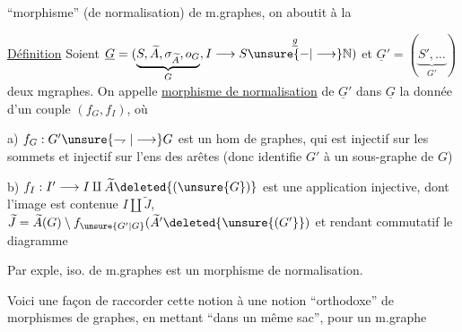 ``morphisme'' (de normalisation) de m.graphes, on aboutit à la

\uline{Définition} Soient $\underline G=(\underbrace{S,\widetilde A,\sigma_{\widetilde A},o_G}_{G},I\longrightarrow S\overset{\underline g}{\unsure{-|\longrightarrow}}\mathbb N)$ et $\underline G'=(\underbrace{S',\ldots}_{G'})$ deux mgraphes. On appelle \uline{morphisme de normalisation} de $\underline G'$ dans $\underline G$ la donnée d'un couple  $(f_G,f_I)$, où

a) $f_G:G'\unsure{\rightharpoondown|\longrightarrow}G$ est un hom de graphes, qui est injectif sur les sommets et injectif sur l'ens des arêtes (donc identifie $G'$ à un sous-graphe de $G$)


b) $f_I:I'\longrightarrow I\amalg\widetilde A\deleted{(\unsure{G})}$ est une application injective, dont l'image est contenue $I\amalg\widetilde J$,  $\widetilde J=\widetilde A(G)\setminus f_{\unsure{G'|G}}(\widetilde A'\deleted{\unsure{(G'}})$ et rendant commutatif le diagramme

Par exple, iso. de m.graphes est un morphisme de normalisation. 

Voici une façon de raccorder cette notion à une notion ``orthodoxe'' de morphismes de graphes, en mettant ``dans un même sac'', pour un m.graphe

